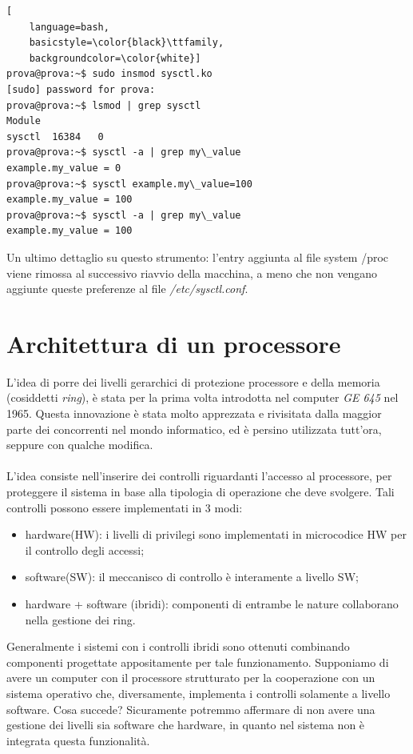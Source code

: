 \begin{lstlisting}[
	language=bash,
	basicstyle=\color{black}\ttfamily,
	backgroundcolor=\color{white}]
prova@prova:~$ sudo insmod sysctl.ko
[sudo] password for prova:
prova@prova:~$ lsmod | grep sysctl
Module
sysctl	16384	0
prova@prova:~$ sysctl -a | grep my\_value
example.my_value = 0
prova@prova:~$ sysctl example.my\_value=100
example.my_value = 100
prova@prova:~$ sysctl -a | grep my\_value
example.my_value = 100
\end{lstlisting}

Un ultimo dettaglio su questo strumento: l'entry aggiunta al file system /proc viene rimossa al successivo riavvio della macchina, a meno che non vengano aggiunte queste preferenze al file \emph{/etc/sysctl.conf}.

\section{Architettura di un processore}

L'idea di porre dei livelli gerarchici di protezione processore e della memoria (cosiddetti \emph{ring}), è stata per la prima volta introdotta nel computer \emph{GE 645} nel 1965. Questa innovazione è stata molto apprezzata e rivisitata dalla maggior parte dei concorrenti nel mondo informatico, ed è persino utilizzata tutt'ora, seppure con qualche modifica.\\\\
L'idea consiste nell'inserire dei controlli riguardanti l'accesso al processore, per proteggere il sistema in base alla tipologia di operazione che deve svolgere. Tali controlli possono essere implementati in 3 modi:

\begin{itemize}
\item hardware(HW): i livelli di privilegi sono implementati in microcodice HW per il controllo degli accessi;
\item software(SW): il meccanisco di controllo è interamente a livello SW;
\item hardware + software (ibridi): componenti di entrambe le nature collaborano nella gestione dei ring.
\end{itemize}

Generalmente i sistemi con i controlli ibridi sono ottenuti combinando componenti progettate appositamente per tale funzionamento. Supponiamo di avere un computer con il processore strutturato per la cooperazione con un sistema operativo che, diversamente, implementa i controlli solamente a livello software. Cosa succede? Sicuramente potremmo affermare di non avere una gestione dei livelli sia software che hardware, in quanto nel sistema non è integrata questa funzionalità.


